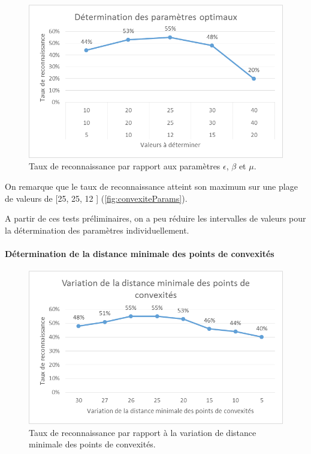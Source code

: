 \begin{figure}[htb!]
\centerline{\includegraphics{convexiteParams.png}}
\caption{Taux de reconnaissance par rapport aux paramètres $\epsilon$, $\beta$ et $\mu$.}
\label{fig:convexiteParams}
\end{figure}

On remarque que le taux de reconnaissance atteint son maximum sur une plage de valeurs de [25, 25, 12 ] (\autoref{fig:convexiteParams}). 

A partir de ces tests préliminaires, on a peu réduire les intervalles de valeurs pour la détermination des paramètres individuellement.

\paragraph{Détermination de la distance minimale des points de convexités}

\begin{figure}[htb!]
\centerline{\includegraphics{convexiteDistMin.png}}
\caption{Taux de reconnaissance par rapport à la variation de distance minimale des points de convexités.}
\label{fig:convexiteDistMin}
\end{figure}

